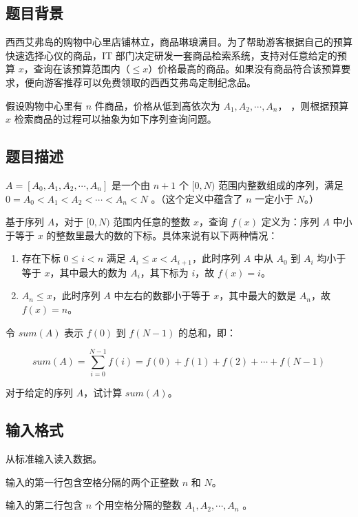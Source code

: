 \subsection*{题目背景}

西西艾弗岛的购物中心里店铺林立，商品琳琅满目。为了帮助游客根据自己的预算快速选择心仪的商品，IT 部门决定研发一套商品检索系统，支持对任意给定的预算 $x$，查询在该预算范围内（$\le x$）价格最高的商品。如果没有商品符合该预算要求，便向游客推荐可以免费领取的西西艾弗岛定制纪念品。

假设购物中心里有 $n$ 件商品，价格从低到高依次为 $A_1,A_2,\cdots, A_n$，
，则根据预算 $x$ 检索商品的过程可以抽象为如下序列查询问题。

\subsection*{题目描述}

$A=[A_0,A_1,A_2,\cdots,A_n]$ 是一个由 $n+1$ 个 $[0,N)$ 范围内整数组成的序列，满足 $0=A_0<A_1<A_2<\cdots<A_n<N$
。（这个定义中蕴含了 $n$ 一定小于 $N$。）

基于序列 $A$，对于 $[0,N)$ 范围内任意的整数 $x$，查询 $f(x)$ 定义为：序列 $A$ 中{\heiti 小于等于} $x$ 的整数里最大的数的{\heiti 下标}。具体来说有以下两种情况：

\begin{enumerate}
  \item 存在下标 $0\le i<n$ 满足 $A_i\le x < A_{i+1}$，此时序列 $A$ 中从 $A_0$ 到 $A_i$ 均小于等于 $x$，其中最大的数为 $A_i$，其下标为 $i$，故 $f(x)=i$。
  \item $A_n\le x$，此时序列 $A$ 中左右的数都小于等于 $x$，其中最大的数是 $A_n$，故 $f(x)=n$。
\end{enumerate}

令 $sum(A)$ 表示 $f(0)$ 到 $f(N-1)$ 的总和，即：

\begin{equation*}
sum(A) = \sum_{i=0}^{N-1} {f(i)=f(0)+f(1)+f(2)+\cdots +f(N-1)}
\end{equation*}

对于给定的序列 $A$，试计算 $sum(A)$。

\subsection*{输入格式}

从标准输入读入数据。

输入的第一行包含空格分隔的两个正整数 $n$ 和 $N$。

输入的第二行包含 $n$ 个用空格分隔的整数 $A_1,A_2,\cdots,A_n$
。

